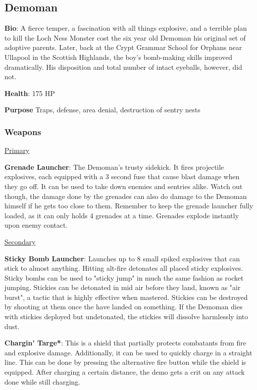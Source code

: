 \subsection{Demoman}
{\bf Bio}:
A fierce temper, a fascination with all things explosive, and a terrible plan to kill the Loch Ness Monster cost the six year old Demoman his original set of adoptive parents. Later, back at the Crypt Grammar School for Orphans near Ullapool in the Scottish Highlands, the boy's bomb-making skills improved dramatically. His disposition and total number of intact eyeballs, however, did not.

{\bf Health}: 175 HP

{\bf Purpose}
Traps, defense, area denial, destruction of sentry nests

\subsubsection {Weapons}


\begin {center}
\underline {Primary}
\end {center}

{\bf Grenade Launcher}: The Demoman's trusty sidekick. It fires projectile explosives, each equipped with a 3 second fuse that cause blast damage when they go off. It can be used to take down enemies and sentries alike. Watch out though, the damage done by the grenades can also do damage to the Demoman himself if he gets too close to them. Remember to keep the grenade launcher fully loaded, as it can only holds 4 grenades at a time. Grenades explode instantly upon enemy contact.

\begin {center}
\underline {Secondary}
\end {center}

{\bf Sticky Bomb Launcher}: Launches up to 8 small spiked explosives that can stick to almost anything. Hitting alt-fire detonates all placed sticky explosives. Sticky bombs can be used to "sticky jump" in much the same fashion as rocket jumping. Stickies can be detonated in mid air before they land, known as "air burst", a tactic that is highly effective when mastered. Stickies can be destroyed by shooting at them once the have landed on something. If the Demoman dies with stickies deployed but undetonated, the stickies will dissolve harmlessly into dust.

{\bf Chargin' Targe*}: This is a shield that partially protects combatants from fire and explosive damage.  Additionally, it can be used to quickly charge in a straight line.  This can be done by pressing the alternative fire button while the shield is equipped. After charging a certain distance, the demo gets a crit on any attack done while still charging. 

